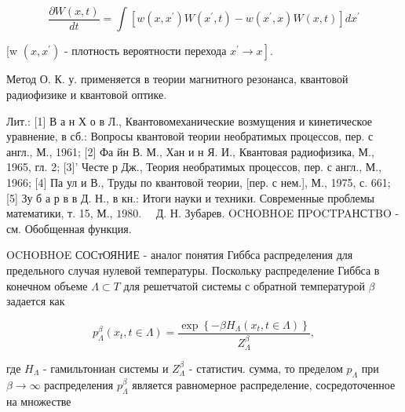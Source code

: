\documentclass[10pt]{article}
\begin{document}
\[

\frac{\partial W(x, t)}{d t}=\int\left[w\left(x, x^{\prime}\right) W\left(x^{\prime}, t\right)-w\left(x^{\prime}, x\right) W(x, t)\right] d x^{\prime}

\]



[w $\left(x, x^{\prime}\right)$ - плотность вероятности перехода $\left.x^{\prime} \rightarrow x\right]$.



Метод О. К. у. применяется в теории магнитного резонанса, квантовой радиофизике и квантовой оптике.



Лит.: [1] В а н Х о в Л., Квантовомеханические возмущения и кинетическое уравнение, в сб.: Вопросы квантовой теории необратимых процессов, пер. с англ., М., 1961; [2] Фа йн В. М., Хан и н Я. И., Квантовая радиофизика, М., 1965, гл. 2; [3]' Честе р Дж., Теория необратимых процессов, пер. с англ., М., 1966; [4] Па ул и В., Труды по квантовой теории, [пер. с нем.], М., 1975, с. 661; [5] Зу б а р в в Д. Н., в кн.: Итоги науки и техники. Современные проблемы математики, т. 15, М., $1980 . \quad$ Д. Н. Зубарев. OCHOBHOE ПPOCTPAНСTBO - см. Обобщенная функция.



OCHOBHOE СОСтОЯНИЕ - аналог понятия Гиббса распределения для предельного случая нулевой температуры. Поскольку распределение Гиббса в конечном объеме $\Lambda \subset T$ для решетчатой системы с обратной температурой $\beta$ задается как



\[

p_{\Lambda}^{\beta}\left(x_{t}, t \in \Lambda\right)=\frac{\exp \left\{-\beta H_{\Lambda}\left(x_{t}, t \in \Lambda\right)\right\}}{Z_{\Lambda}^{\beta}},

\]



где $H_{\Lambda}$ - гамильтониан системы и $Z_{\Lambda}^{\beta}$ - статистич. сумма, то пределом $p_{\Lambda}$ при $\beta \rightarrow \infty$ распределения $p_{\Lambda}^{\beta}$ является равномерное распределение, сосредоточенное на множестве
\end{document}
